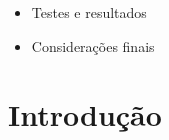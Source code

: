 \documentclass[10pt]{beamer}
\begin{document}
\begin{frame}
\begin{itemize}
    \item[\color{gray}{$\bullet$}] Testes e resultados

    \item[\color{gray}{$\bullet$}] Considerações finais

  \end{itemize}

\end{frame}


\section{Introdução}
\end{document}
